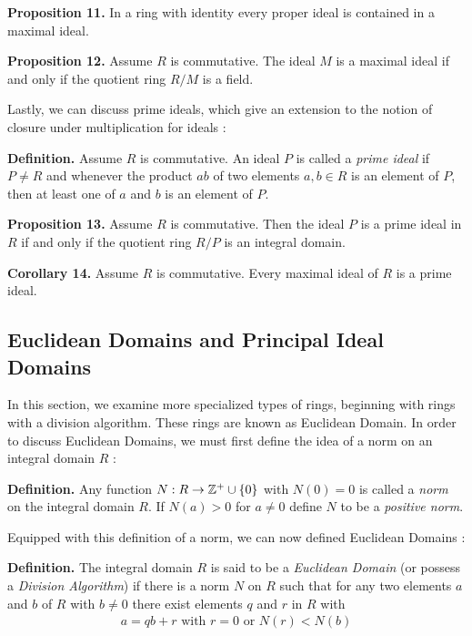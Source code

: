 \documentclass[11pt, reqno]{amsart}
\theoremstyle{plain}
\theoremstyle{definition}
\theoremstyle{example}
\begin{document}
\par
\textbf{Proposition 11.} In a ring with identity every proper ideal is contained in a maximal ideal.

\par
\textbf{Proposition 12.} Assume $R$ is commutative. The ideal $M$ is a maximal ideal if and only if the quotient ring $R/M$ is a field.

\par
Lastly, we can discuss prime ideals, which give an extension to the notion of closure under multiplication for ideals \cite[\S 7.4, p. 255-256]{dummit}:

\par
\textbf{Definition.} Assume $R$ is commutative. An ideal $P$ is called a \textit{prime ideal} if $P \neq R$ and whenever the product $ab$ of two elements $a, b \in R$ is an element of $P$, then at least one of $a$ and $b$ is an element of $P$.

\par
\textbf{Proposition 13.} Assume $R$ is commutative. Then the ideal $P$ is a prime ideal in $R$ if and only if the quotient ring $R/P$ is an integral domain.

\par
\textbf{Corollary 14.} Assume $R$ is commutative. Every maximal ideal of $R$ is a prime ideal.

\newpage
\subsection{Euclidean Domains and Principal Ideal Domains}

In this section, we examine more specialized types of rings, beginning with rings with a division algorithm. These rings are known as Euclidean Domain. In order to discuss Euclidean Domains, we must first define the idea of a norm on an integral domain $R$ \cite[\S 8.1, p.  270]{dummit}:

\par
\textbf{Definition.} Any function $N: R \to \mathbb{Z}^+ \cup \{0\}$ with $N(0) = 0$ is called a \textit{norm} on the integral domain $R$. If $N(a) > 0$ for $a \neq 0$ define $N$ to be a \textit{positive norm}.

\par
Equipped with this definition of a norm, we can now defined Euclidean Domains \cite[\S 8.1, p. 270]{dummit}:

\par
\textbf{Definition.} The integral domain $R$ is said to be a \textit{Euclidean Domain} (or possess a \textit{Division Algorithm}) if there is a norm $N$ on $R$ such that for any two elements $a$ and $b$ of $R$ with $b \neq 0$ there exist elements $q$ and $r$ in $R$ with
\begin{align*}
a = qb + r \text{   with } r = 0 \text{ or } N(r) < N(b)
\end{align*}
\end{document}

